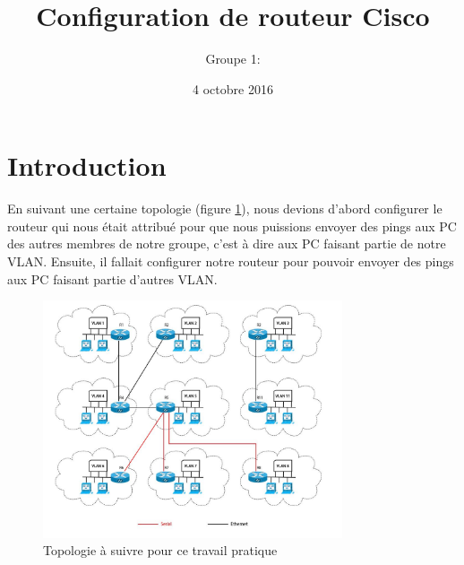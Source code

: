 \documentclass[a4paper,11pt]{article}
\title{Configuration de routeur Cisco}
\author{Groupe 1:}
\date{4 octobre 2016}
\begin{document}
\maketitle

\section{Introduction}
En suivant une certaine topologie (figure \ref{fig:topo}),
nous devions d'abord configurer le routeur qui nous était attribué pour que nous puissions envoyer des pings aux PC des autres membres de notre groupe,
c'est à dire aux PC faisant partie de notre VLAN.
Ensuite, il fallait configurer notre routeur pour pouvoir envoyer des pings aux PC faisant partie d'autres VLAN.
\begin{figure}
 \centering
 \includegraphics[height=7cm]{topo.jpg}
 \caption{Topologie à suivre pour ce travail pratique}
 \label{fig:topo}
\end{figure}
\end{document}
